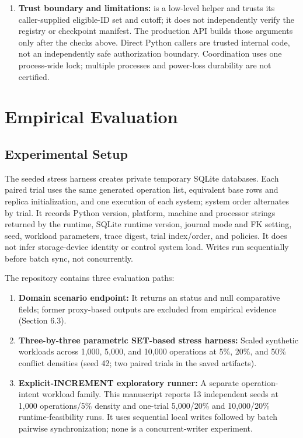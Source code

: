 \documentclass[runningheads]{llncs}
\begin{document}
\begin{enumerate}
\item \textbf{Trust boundary and limitations:} \texttt{} is a low-level helper and trusts its caller-supplied eligible-ID set and cutoff; it does not independently verify the registry or checkpoint manifest. The production API builds those arguments only after the checks above. Direct Python callers are trusted internal code, not an independently safe authorization boundary. Coordination uses one process-wide lock; multiple processes and power-loss durability are not certified.
\end{enumerate}
\section{Empirical Evaluation}
\subsection{Experimental Setup}
The seeded stress harness creates private temporary SQLite databases. Each paired trial uses the same generated operation list, equivalent base rows and replica initialization, and one execution of each system; system order alternates by trial. It records Python version, platform, machine and processor strings returned by the runtime, SQLite runtime version, journal mode and FK setting, seed, workload parameters, trace digest, trial index/order, and policies. It does not infer storage-device identity or control system load. Writes run sequentially before batch sync, not concurrently.

The repository contains three evaluation paths:

\begin{enumerate}
\item \textbf{Domain scenario endpoint:} It returns an \texttt{} status and null comparative fields; former proxy-based outputs are excluded from empirical evidence (Section 6.3).
\item \textbf{Three-by-three parametric SET-based stress harness:} Scaled synthetic workloads across 1,000, 5,000, and 10,000 operations at 5\%, 20\%, and 50\% conflict densities (seed 42; two paired trials in the saved artifacts).
\item \textbf{Explicit-INCREMENT exploratory runner:} A separate operation-intent workload family. This manuscript reports 13 independent seeds at 1,000 operations/5\% density and one-trial 5,000/20\% and 10,000/20\% runtime-feasibility runs. It uses sequential local writes followed by batch pairwise synchronization; none is a concurrent-writer experiment.
\end{enumerate}
\end{document}
